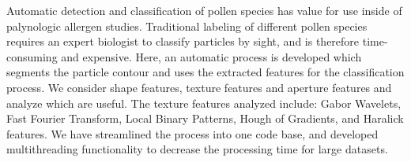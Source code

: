 Automatic detection and classification of pollen species has value for use inside of palynologic allergen studies. Traditional labeling of different pollen species requires an expert biologist to classify particles by sight, and is therefore time-consuming and expensive. Here, an automatic process is developed which segments the particle contour and uses the extracted features for the classification process. We consider shape features, texture features and aperture features and analyze which are useful. The texture features analyzed include: Gabor Wavelets, Fast Fourier Transform, Local Binary Patterns, Hough of Gradients, and Haralick features. We have streamlined the process into one code base, and developed multithreading functionality to decrease the processing time for large datasets.
    